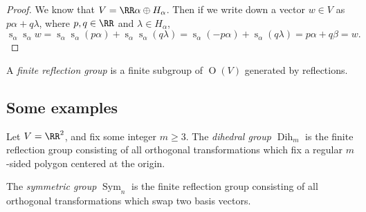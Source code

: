 \documentclass{article}
\DeclareMathOperator{\s}{s}
\DeclareMathOperator{\ogroup}{O}
\DeclareMathOperator{\Dih}{Dih}
\DeclareMathOperator{\Sym}{Sym}
\begin{document}
\begin{proof}
    We know that $V = \RR\alpha \oplus H_\alpha$.
    Then if we write down a vector $w \in V$ as $p\alpha + q\lambda$, where $p,q \in \RR$ and $\lambda \in H_\alpha$,
    \[
        \s_\alpha \s_\alpha w = \s_\alpha \s_\alpha (p\alpha) + \s_\alpha \s_\alpha (q\lambda) = \s_\alpha(-p\alpha) + \s_\alpha(q\lambda) = p\alpha + q\beta = w.
    \]
\end{proof}

\begin{definition}
    A \textit{finite reflection group} is a finite subgroup of $\ogroup(V)$ generated by reflections.
\end{definition}

\subsection{Some examples}

\begin{definition}
    Let $V = \RR^2$, and fix some integer $m \geq 3$.
    The \textit{dihedral group $\Dih_{m}$} is the finite reflection group consisting of all orthogonal transformations which fix a regular $m$-sided polygon centered at the origin.
\end{definition}

\begin{definition}
    The \textit{symmetric group} $\Sym_n$ is the finite reflection group consisting of all orthogonal transformations which swap two basis vectors.
\end{definition}
\end{document}
